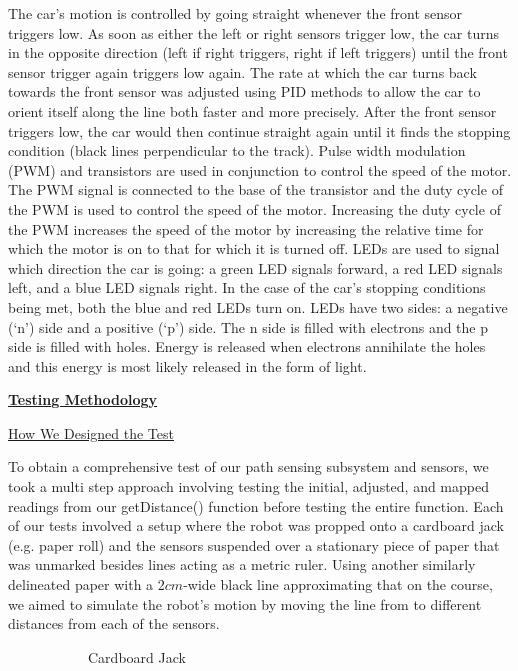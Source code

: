 \documentclass[twocolumn]{article}
\newcommand{\sectionTitle}[1]{ {\large\textbf{\uline{#1}}} \\ \vspace{1.5em} }
\newcommand{\subsectionTitle}[1]{ {\hspace{2em}\uline{#1}} \\ \vspace{1em} }
\newcommand{\textIntroTwo}{The car's motion is controlled by going straight whenever the front sensor triggers low. As soon as either the left or right sensors trigger low, the car turns in the opposite direction (left if right triggers, right if left triggers) until the front sensor trigger again triggers low again. The rate at which the car turns back towards the front sensor was adjusted using PID methods\cite{beauregard_2011} to allow the car to orient itself along the line both faster and more precisely. After the front sensor triggers low, the car would then continue straight again until it finds the stopping condition (black lines perpendicular to the track). Pulse width modulation (PWM) and transistors are used in conjunction to control the speed of the motor. The PWM signal is connected to the base of the transistor and the duty cycle of the PWM is used to control the speed of the motor. Increasing the duty cycle of the PWM increases the speed of the motor by increasing the relative time for which the motor is on to that for which it is turned off. LEDs are used to signal which direction the car is going: a green LED signals forward, a red LED signals left, and a blue LED signals right. In the case of the car’s stopping conditions being met, both the blue and red LEDs turn on. LEDs have two sides: a negative (`n’) side and a positive (`p’) side. The n side is filled with electrons and the p side is filled with holes. Energy is released when electrons annihilate the holes and this energy is most likely released in the form of light.
}
\newcommand{\textTestDesign}{To obtain a comprehensive test of our path sensing subsystem and sensors, we took a multi step approach involving testing the initial, adjusted, and mapped readings from our getDistance() function before testing the entire function. Each of our tests involved a setup where the robot was propped onto a cardboard jack (e.g. paper roll) and the sensors suspended over a stationary piece of paper that was unmarked besides lines acting as a metric ruler. Using another similarly delineated paper with a $2cm$-wide black line approximating that on the course, we aimed to simulate the robot’s motion by moving the line from to different distances from each of the sensors.
}
\begin{document}
\begin{flushleft}
		\textIntroTwo \\ \vspace{1em}
		
		\sectionTitle{Testing Methodology}
		
		\subsectionTitle{How We Designed the Test}

		\textTestDesign \\ \vspace{1em}
		
		\begin{figure}[!H]
			
			{\begin{subfigure}[b]{0.45\textwidth}
					\caption{Cardboard Jack}
					\label{fig:procedureRig}
				\end{subfigure}\\ \vspace{1em}%
				\begin{subfigure}[b]{0.45\textwidth}

\end{subfigure}}
\end{figure}
\end{flushleft}
\end{document}
